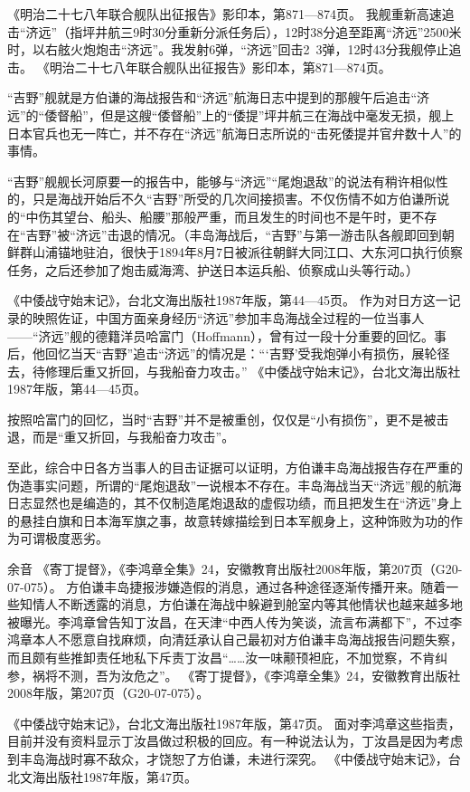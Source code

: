 \documentclass[12pt,UTF8]{ctexbook}
\begin{document}
《明治二十七八年联合舰队出征报告》影印本，第871—874页。
我舰重新高速追击“济远”（指坪井航三9时30分重新分派任务后），12时38分追至距离“济远”2500米时，以右舷火炮炮击“济远”。我发射6弹，“济远”回击2~3弹，12时43分我舰停止追击。 《明治二十七八年联合舰队出征报告》影印本，第871—874页。

“吉野”舰就是方伯谦的海战报告和“济远”航海日志中提到的那艘午后追击“济远”的“倭督船”，但是这艘“倭督船”上的“倭提”坪井航三在海战中毫发无损，舰上日本官兵也无一阵亡，并不存在“济远”航海日志所说的“击死倭提并官弁数十人”的事情。

“吉野”舰舰长河原要一的报告中，能够与“济远”“尾炮退敌”的说法有稍许相似性的，只是海战开始后不久“吉野”所受的几次间接损害。不仅伤情不如方伯谦所说的“中伤其望台、船头、船腰”那般严重，而且发生的时间也不是午时，更不存在“吉野”被“济远”击退的情况。（丰岛海战后，“吉野”与第一游击队各舰即回到朝鲜群山浦锚地驻泊，很快于1894年8月7日被派往朝鲜大同江口、大东河口执行侦察任务，之后还参加了炮击威海湾、护送日本运兵船、侦察成山头等行动。）

《中倭战守始末记》，台北文海出版社1987年版，第44—45页。
作为对日方这一记录的映照佐证，中国方面亲身经历“济远”参加丰岛海战全过程的一位当事人——“济远”舰的德籍洋员哈富门（Hoffmann），曾有过一段十分重要的回忆。事后，他回忆当天“吉野”追击“济远”的情况是：“‘吉野’受我炮弹小有损伤，展轮径去，待修理后重又折回，与我船奋力攻击。” 《中倭战守始末记》，台北文海出版社1987年版，第44—45页。

按照哈富门的回忆，当时“吉野”并不是被重创，仅仅是“小有损伤”，更不是被击退，而是“重又折回，与我船奋力攻击”。

至此，综合中日各方当事人的目击证据可以证明，方伯谦丰岛海战报告存在严重的伪造事实问题，所谓的“尾炮退敌”一说根本不存在。丰岛海战当天“济远”舰的航海日志显然也是编造的，其不仅制造尾炮退敌的虚假功绩，而且把发生在“济远”身上的悬挂白旗和日本海军旗之事，故意转嫁描绘到日本军舰身上，这种饰败为功的作为可谓极度恶劣。

余音
《寄丁提督》，《李鸿章全集》24，安徽教育出版社2008年版，第207页（G20-07-075）。
方伯谦丰岛捷报涉嫌造假的消息，通过各种途径逐渐传播开来。随着一些知情人不断透露的消息，方伯谦在海战中躲避到舱室内等其他情状也越来越多地被曝光。李鸿章曾告知丁汝昌，在天津“中西人传为笑谈，流言布满都下”，不过李鸿章本人不愿意自找麻烦，向清廷承认自己最初对方伯谦丰岛海战报告问题失察，而且颇有些推卸责任地私下斥责丁汝昌“……汝一味颟顸袒庇，不加觉察，不肯纠参，祸将不测，吾为汝危之”。 《寄丁提督》，《李鸿章全集》24，安徽教育出版社2008年版，第207页（G20-07-075）。

《中倭战守始末记》，台北文海出版社1987年版，第47页。
面对李鸿章这些指责，目前并没有资料显示丁汝昌做过积极的回应。有一种说法认为，丁汝昌是因为考虑到丰岛海战时寡不敌众，才饶恕了方伯谦，未进行深究。 《中倭战守始末记》，台北文海出版社1987年版，第47页。
\end{document}
